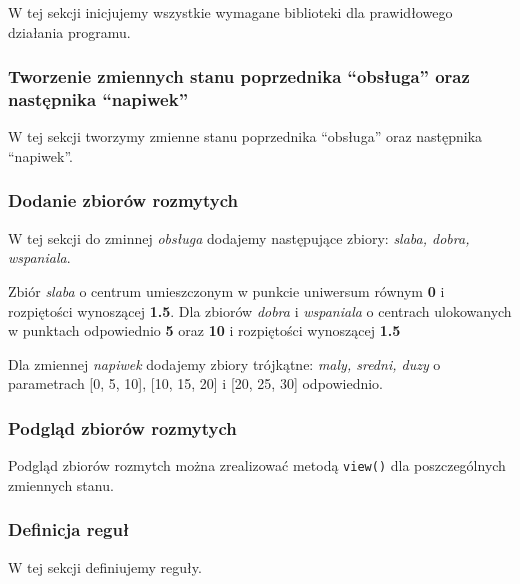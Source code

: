 \documentclass[a4paper, 10pt]{article}
\begin{document}
W tej sekcji inicjujemy wszystkie wymagane biblioteki dla prawidłowego działania programu.



\subsubsection{Tworzenie zmiennych stanu poprzednika ``obsługa'' oraz następnika ``napiwek''}\label{p2}

W tej sekcji tworzymy zmienne stanu poprzednika ``obsługa'' oraz następnika ``napiwek''.



\subsubsection{Dodanie zbiorów rozmytych}\label{p3}
 
W tej sekcji do zminnej \emph{obsługa} dodajemy następujące zbiory: \emph{slaba, dobra, wspaniala}. 

Zbiór \emph{slaba} o centrum umieszczonym w punkcie uniwersum równym \textbf{0} i rozpiętości wynoszącej \textbf{1.5}. Dla zbiorów \emph{dobra} i \emph{wspaniala} o centrach ulokowanych w punktach odpowiednio \textbf{5} oraz \textbf{10} i rozpiętości wynoszącej \textbf{1.5}

Dla zmiennej \emph{napiwek} dodajemy zbiory trójkątne: \emph{maly, sredni, duzy} o parametrach [0, 5, 10], [10, 15, 20] i [20, 25, 30] odpowiednio.



\subsubsection{Podgląd zbiorów rozmytych}\label{p4}

Podgląd zbiorów rozmytch można zrealizować metodą \verb|view()| dla poszczególnych zmiennych stanu.



\subsubsection{Definicja reguł}\label{p5}

W tej sekcji definiujemy reguły.


\end{document}
